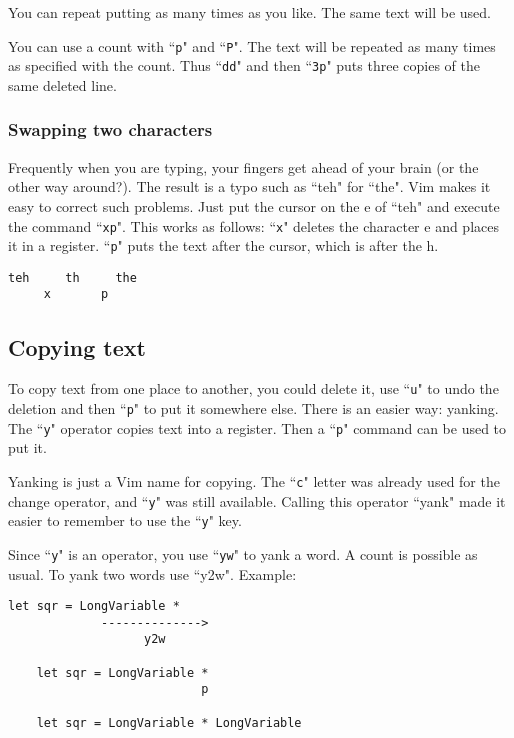 You can repeat putting as many times as you like.
The same text will be used.

You can use a count with ``\texttt{p}" and ``\texttt{P}".
The text will be repeated as many times as specified with the count.
Thus ``\texttt{dd}" and then ``\texttt{3p}" puts three copies of the same deleted line.

\subsubsection{Swapping two characters}

Frequently when you are typing, your fingers get ahead of your brain (or the other way around?).
The result is a typo such as ``teh" for ``the".
Vim makes it easy to correct such problems.
Just put the cursor on the e of ``teh" and execute the command ``\texttt{xp}".
This works as follows: ``\texttt{x}" deletes the character e and places it in a register.
``\texttt{p}" puts the text after the cursor, which is after the h.

\begin{Verbatim}[samepage=true]
    teh     th     the 
     x       p
\end{Verbatim}

\subsection{Copying text}

To copy text from one place to another, you could delete it, use ``\texttt{u}" to undo the deletion and then ``\texttt{p}" to put it somewhere else.
There is an easier way: yanking.
The ``\texttt{y}" operator copies text into a register.
Then a ``\texttt{p}" command can be used to put it.

Yanking is just a Vim name for copying.
The ``\texttt{c}" letter was already used for the change operator, and ``\texttt{y}" was still available.
Calling this operator ``yank" made it easier to remember to use the ``\texttt{y}" key.

Since ``\texttt{y}" is an operator, you use ``\texttt{yw}" to yank a word.
A count is possible as usual.
To yank two words use ``y2w".
Example:

\begin{Verbatim}[samepage=true]
    let sqr = LongVariable * 
             -------------->
                   y2w

    let sqr = LongVariable * 
                           p

    let sqr = LongVariable * LongVariable 
\end{Verbatim}

